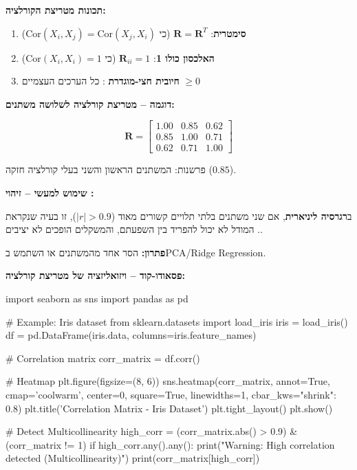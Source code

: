 \textbf{תכונות מטריצת הקורלציה:}

\begin{enumerate}
\item \textbf{סימטרית}: $\mathbf{R} = \mathbf{R}^T$ (כי $\text{Cor}(X_i, X_j) = \text{Cor}(X_j, X_i)$)
\item \textbf{האלכסון כולו \num{1}}: $\mathbf{R}_{ii} = 1$ (כי $\text{Cor}(X_i, X_i) = 1$)
\item \textbf{חיובית חצי-מוגדרת} : כל הערכים העצמיים $\geq 0$
\end{enumerate}

\textbf{דוגמה – מטריצת קורלציה לשלושה משתנים:}

\[
\mathbf{R} = \begin{bmatrix}
1.00 & 0.85 & 0.62 \\
0.85 & 1.00 & 0.71 \\
0.62 & 0.71 & 1.00
\end{bmatrix}
\]

פרשנות: המשתנים הראשון והשני בעלי קורלציה חזקה ($0.85$).

\textbf{שימוש למעשי – זיהוי :}

ב\textbf{רגרסיה ליניארית}, אם שני משתנים בלתי תלויים קשורים מאוד ($|r| > 0.9$), זו בעיה שנקראת \textbf{}. המודל לא יכול להפריד בין השפעתם, והמשקלים הופכים לא יציבים.

\textbf{פתרון:} הסר אחד מהמשתנים או השתמש ב\en{-}PCA/Ridge Regression.

\textbf{פסאודו-קוד – ויזואליזציה של מטריצת קורלציה:}

\begin{pythonbox}
import seaborn as sns
import pandas as pd

# Example: Iris dataset
from sklearn.datasets import load_iris
iris = load_iris()
df = pd.DataFrame(iris.data, columns=iris.feature_names)

# Correlation matrix
corr_matrix = df.corr()

# Heatmap
plt.figure(figsize=(8, 6))
sns.heatmap(corr_matrix, annot=True, cmap='coolwarm', center=0,
            square=True, linewidths=1, cbar_kws={"shrink": 0.8})
plt.title('Correlation Matrix - Iris Dataset')
plt.tight_layout()
plt.show()

# Detect Multicollinearity
high_corr = (corr_matrix.abs() > 0.9) & (corr_matrix != 1)
if high_corr.any().any():
    print("Warning: High correlation detected (Multicollinearity)")
    print(corr_matrix[high_corr])
\end{pythonbox}

